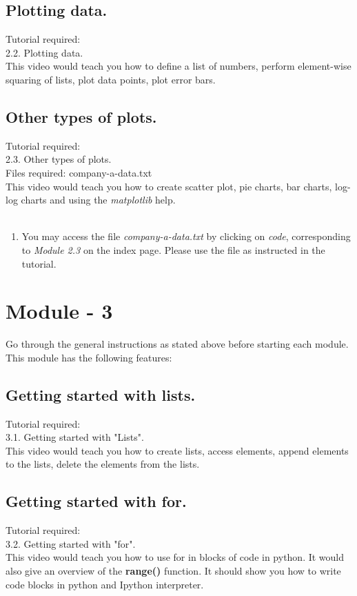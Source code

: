 \documentclass[11pt,twocolumn]{article}
\newenvironment{enumcpt}{\begin{enumerate} \topsep 0pt \partopsep 0pt 
                        \parsep 0pt
                        \itemsep 0pt \leftmargin -1in \rightmargin 0pt
                        }{\end{enumerate}}
\begin{document}
  \subsection{Plotting data.}
  Tutorial required: \\ 2.2. Plotting data. \\
    This video would teach you how to define a list of numbers, perform element-wise squaring of lists, plot data points, plot error bars. 
    \subsection{Other types of plots.}
    Tutorial required:\\ 2.3. Other types of plots. \\
    Files required: company-a-data.txt \\
    This video would teach you how to create scatter plot, pie charts, bar charts, log-log charts and using the \emph{matplotlib} help.\\ \\
\begin{enumcpt}
\item You may access the file \emph{company-a-data.txt} by clicking on \emph{code}, corresponding to \emph{Module 2.3} on the index page. Please use the file as instructed in the tutorial. 
\end{enumcpt}
  
\section{Module - 3}
Go through the general instructions as stated above before starting each module.\\
This module has the following features:
\subsection{Getting started with lists.}
Tutorial required: \\ 3.1. Getting started with "Lists". \\
This video would teach you how to create lists, access elements, append elements to the lists, delete the elements from the lists. 
\subsection{Getting started with for.}
Tutorial required: \\ 3.2. Getting started with "for". \\
This video would teach you how to use for in blocks of code in python. It would also give an overview of the \textbf{range()} function. It should show you how to write code blocks in python and Ipython interpreter. 
\end{document}
